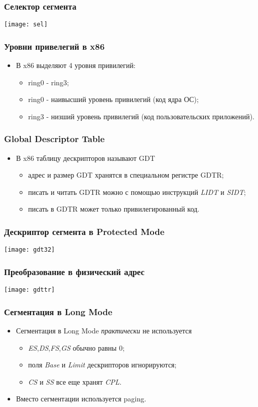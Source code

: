 \begin{frame}
\frametitle{Селектор сегмента}
\texttt{[image: sel]}
\end{frame}

\begin{frame}
\frametitle{Уровни привелегий в x86}
\begin{itemize}
    \item<1->В x86 выделяют 4 уровня привилегий:
    \begin{itemize}
        \item<1->ring0 - ring3;
        \item<2->ring0 - наивысший уровень привилегий (код ядра ОС);
        \item<2->ring3 - низший уровень привилегий (код пользовательских
                 приложений).
    \end{itemize}
\end{itemize}
\end{frame}

\begin{frame}
\frametitle{Global Descriptor Table}
\begin{itemize}
    \item<1->В x86 таблицу дескрипторов называют GDT
    \begin{itemize}
        \item<2->адрес и размер GDT хранятся в специальном регистре GDTR;
        \item<3->писать и читать GDTR можно с помощью инструкций \emph{LIDT}
        и \emph{SIDT};
        \item<4->писать в GDTR может только привилегированный код.
    \end{itemize}
\end{itemize}
\end{frame}

\begin{frame}
\frametitle{Дескриптор сегмента в Protected Mode}
\texttt{[image: gdt32]}
\end{frame}

\begin{frame}
\frametitle{Преобразование в физический адрес}
\texttt{[image: gdttr]}
\end{frame}

\begin{frame}
\frametitle{Сегментация в Long Mode}
\begin{itemize}
    \item<1->Сегментация в Long Mode \emph{практически} не используется
    \begin{itemize}
       \item<2->\emph{ES},\emph{DS},\emph{FS},\emph{GS} обычно равны 0;
       \item<3->поля \emph{Base} и \emph{Limit} дескрипторов игнорируются;
       \item<4->\emph{CS} и \emph{SS} все еще хранят \emph{CPL}.
    \end{itemize}
    \item<5->Вместо сегментации используется paging.
\end{itemize}
\end{frame}

